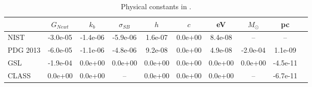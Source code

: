 \begin{table}
  \begin{center}
  \caption{Physical constants in \ccl. \label{tab:constants_comparison}}
  \begin{tabular}{lccccccccc}
\hline\hline
 & $G_{Newt}$ & $k_b$ & $\sigma_{SB}$ & $h$ & $c$ & eV  & $M_\odot$ & pc \\ 
\hline
NIST & -3.0e-05 & -1.4e-06 & -5.9e-06 & 1.6e-07 & 0.0e+00 & 8.4e-08 & \--- & \--- \\[3pt]
 PDG 2013 & -6.0e-05 & -1.1e-06 & -4.8e-06 & 9.2e-08 & 0.0e+00 & 4.9e-08 & -2.0e-04 & 1.1e-09 \\[3pt] 
GSL & -1.9e-04 & 0.0e+00 & 0.0e+00 & 0.0e+00 & 0.0e+00 & 0.0e+00 & 0.0e+00 & -4.5e-11 \\ [3pt]
CLASS & 0.0e+00 & 0.0e+00 & \--- & 0.0e+00 & 0.0e+00 & 0.0e+00 & \--- & -6.7e-11 
\\\hline\hline
\end{tabular}
\end{center}
\end{table}

